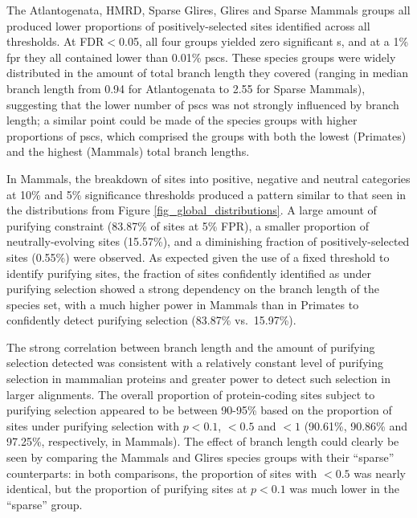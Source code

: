 The Atlantogenata, HMRD, Sparse Glires, Glires and Sparse Mammals
groups all produced lower proportions of positively-selected sites
identified across all \fpr thresholds. At FDR$<$0.05, all four groups
yielded zero significant \psc{}s, and at a 1\% \ac{fpr} they all
contained lower than 0.01\% \acp{psc}. These species groups were
widely distributed in the amount of total branch length they covered
(ranging in median \ngap branch length from 0.94 for Atlantogenata to
2.55 for Sparse Mammals), suggesting that the lower number of
\acp{psc} was not strongly influenced by branch length; a similar
point could be made of the species groups with higher proportions of
\acp{psc}, which comprised the groups with both the lowest (Primates)
and the highest (Mammals) total branch lengths.

In Mammals, the breakdown of sites into positive, negative and neutral
categories at 10\% and 5\% significance thresholds produced a pattern
similar to that seen in the \omgml distributions from Figure
\ref{fig_global_distributions}. A large amount of purifying constraint
(83.87\% of sites at 5\% FPR), a smaller proportion of
neutrally-evolving sites (15.57\%), and a diminishing fraction of
positively-selected sites (0.55\%) were observed. As expected given
the use of a fixed \slrt threshold to identify purifying sites, the
fraction of sites confidently identified as under purifying selection
showed a strong dependency on the branch length of the species set,
with a much higher power in Mammals than in Primates to confidently
detect purifying selection (83.87\% vs.\ 15.97\%).

The strong correlation between branch length and the amount of
purifying selection detected was consistent with a relatively constant
level of purifying selection in mammalian proteins and greater power
to detect such selection in larger alignments. The overall proportion
of protein-coding sites subject to purifying selection appeared to be
between 90-95\% based on the proportion of sites under purifying
selection with $p<0.1$, \omgml$<0.5$ and \omgml$<1$ (90.61\%, 90.86\%
and 97.25\%, respectively, in Mammals). The effect of branch length
could clearly be seen by comparing the Mammals and Glires species
groups with their ``sparse'' counterparts: in both comparisons, the
proportion of sites with \omgml$<0.5$ was nearly identical, but the
proportion of purifying sites at $p<0.1$ was much lower in the
``sparse'' group.

